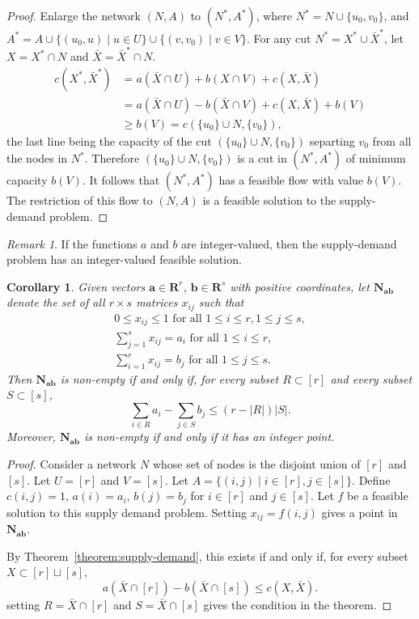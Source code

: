 \documentclass{amsbook}
\newcommand{\bb}{\mathbf b}
\renewcommand{\aa}{\mathbf a}
\newcommand{\RR}{\mathbf R}
\newcommand{\NN}{\mathbf N}
\newtheorem{corollary}[theorem]{Corollary}
\theoremstyle{definition}
\theoremstyle{remark}
\newtheorem{remark}[theorem]{Remark}
\begin{document}
\begin{proof}
  Enlarge the network $(N,A)$ to $(N^*,A^*)$, where $N^*=N\cup\{u_0,v_0\}$, and $A^*=A\cup\{(u_0,u)\mid u\in U\}\cup \{(v,v_0)\mid v\in V\}$.
  For any cut $N^*=X^*\cup \bar X^*$, let $X=X^*\cap N$ and $\bar X = \bar X^*\cap N$.
  \begin{align*}
    c(X^*,\bar X^*) & = a(\bar X\cap U) + b(X\cap V) + c(X,\bar X)\\
                    & = a(\bar X\cap U) - b(\bar X\cap V) + c(X,\bar X) + b(V)\\
                    & \geq b(V)=c(\{u_0\}\cup N,\{v_0\}), 
  \end{align*}
  the last line being the capacity of the cut $(\{u_0\}\cup N,\{v_0\})$ separting $v_0$ from all the nodes in $N^*$.
  Therefore $(\{u_0\}\cup N,\{v_0\})$ is a cut in $(N^*,A^*)$ of minimum capacity $b(V)$.
  It follows that $(N^*,A^*)$ has a feasible flow with value $b(V)$.
  The restriction of this flow to $(N,A)$ is a feasible solution to the supply-demand problem.
\end{proof}
\begin{remark}
  If the functions $a$ and $b$ are integer-valued, then the supply-demand problem has an integer-valued feasible solution.
\end{remark}
\begin{corollary}
  Given vectors $\aa\in \RR^r$, $\bb\in \RR^s$ with positive coordinates, let $\NN_{\aa\bb}$ denote the set of all $r\times s$ matrices $x_{ij}$ such that
  \begin{gather*}
    0\leq x_{ij}\leq 1 \text{ for all }1\leq i\leq r,1\leq j\leq s,\\
    \sum_{j=1}^s x_{ij} = a_i \text{ for all } 1\leq i\leq r,\\
    \sum_{i=1}^r x_{ij} = b_j \text{ for all } 1\leq j\leq s.
  \end{gather*}
  Then $\NN_{\aa\bb}$ is non-empty if and only if, for every subset $R\subset [r]$ and every subset $S\subset [s]$,
  \begin{displaymath}
    \sum_{i\in R} a_i - \sum_{j\in S} b_j \leq (r-|R|)|S|.
  \end{displaymath}
  Moreover, $\NN_{\aa\bb}$ is non-empty if and only if it has an integer point.
\end{corollary}
\begin{proof}
  Consider a network $N$ whose set of nodes is the disjoint union of $[r]$ and $[s]$.
  Let $U=[r]$ and $V=[s]$.
  Let $A=\{(i,j)\mid i\in [r],j\in [s]\}$.
  Define $c(i,j)=1$, $a(i)=a_i$, $b(j)=b_j$ for $i\in [r]$ and $j\in [s]$.
  Let $f$ be a feasible solution to this supply demand problem.
  Setting $x_{ij}=f(i,j)$ gives a point in $\NN_{\aa\bb}$.

  By Theorem~\ref{theorem:supply-demand}, this exists if and only if, for every subset $X\subset [r]\sqcup [s]$,
  \begin{displaymath}
    a(\bar X\cap [r]) - b(\bar X\cap [s]) \leq c(X,\bar X).
  \end{displaymath}
  setting $R=\bar X\cap [r]$ and $S=\bar X\cap [s]$ gives the condition in the theorem.
\end{proof}
\end{document}
